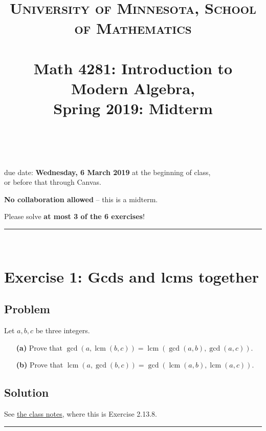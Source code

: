 \documentclass[paper=a4, fontsize=12pt]{scrartcl} %
\title{	
\normalfont \normalsize 
\textsc{University of Minnesota, School of Mathematics} \\ [25pt] %
\horrule{0.5pt} \\[0.4cm] %
\huge Math 4281: Introduction to Modern Algebra, \\
Spring 2019:
Midterm \psetnumber\\%
\horrule{2pt} \\[0.5cm] %
}
\author{\myname}
\newcommand{\lcm}{\operatorname{lcm}}
\newcommand{\tup}[1]{\left( #1 \right)}
\newcommand{\horrule}[1]{\rule{\linewidth}{#1}} %
\theoremstyle{plainsl}
\theoremstyle{definition}
\theoremstyle{remark}
\begin{document}
\maketitle %

\begin{center} %
{\large due date: \textbf{Wednesday, 6 March 2019} at the beginning of class, \\
or before that through Canvas.

\textbf{No collaboration allowed} -- this is a midterm.

Please solve \textbf{at most 3 of the 6 exercises}!}
\end{center}

\horrule{0.3pt} \\[0.4cm]

\section{Exercise 1: Gcds and lcms together}

\subsection{Problem}

Let $a, b, c$ be three integers.

\begin{enumerate}

\item[\textbf{(a)}]
Prove that
$\gcd\tup{a, \lcm\tup{b, c}}
= \lcm\tup{\gcd\tup{a, b}, \gcd\tup{a, c}}$.

\item[\textbf{(b)}]
Prove that
$\lcm\tup{a, \gcd\tup{b, c}}
= \gcd\tup{\lcm\tup{a, b}, \lcm\tup{a, c}}$.

\end{enumerate}

\subsection{Solution}

See
\href{http://www-users.math.umn.edu/~dgrinber/19s/notes.pdf}{the class notes},
where this is Exercise 2.13.8.

\horrule{0.3pt} \\[0.4cm]
\end{document}
